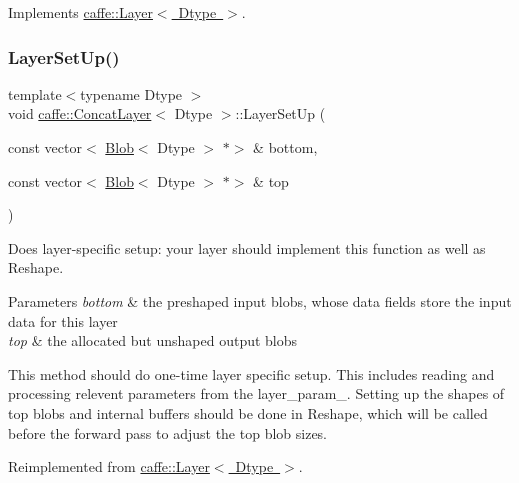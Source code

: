 Implements \mbox{\hyperlink{classcaffe_1_1_layer_a576ac6a60b1e99fe383831f52a6cea77}{caffe\+::\+Layer$<$ Dtype $>$}}.

\mbox{\label{classcaffe_1_1_concat_layer_af4fc13f4977f84a30af260096ffd55d2}} 
\subsubsection{\texorpdfstring{Layer\+Set\+Up()}{LayerSetUp()}\hspace{0.1cm}{\footnotesize\ttfamily [1/2]}}
{\footnotesize\ttfamily template$<$typename Dtype $>$ \\
void \mbox{\hyperlink{classcaffe_1_1_concat_layer}{caffe\+::\+Concat\+Layer}}$<$ Dtype $>$\+::Layer\+Set\+Up (\begin{DoxyParamCaption}\item[{const vector$<$ \mbox{\hyperlink{classcaffe_1_1_blob}{Blob}}$<$ Dtype $>$ $\ast$$>$ \&}]{bottom,  }\item[{const vector$<$ \mbox{\hyperlink{classcaffe_1_1_blob}{Blob}}$<$ Dtype $>$ $\ast$$>$ \&}]{top }\end{DoxyParamCaption})\hspace{0.3cm}{\ttfamily [virtual]}}



Does layer-\/specific setup\+: your layer should implement this function as well as Reshape. 


\begin{DoxyParams}{Parameters}
{\em bottom} & the preshaped input blobs, whose data fields store the input data for this layer \\
\hline
{\em top} & the allocated but unshaped output blobs\\
\hline
\end{DoxyParams}
This method should do one-\/time layer specific setup. This includes reading and processing relevent parameters from the {\ttfamily layer\+\_\+param\+\_\+}. Setting up the shapes of top blobs and internal buffers should be done in {\ttfamily Reshape}, which will be called before the forward pass to adjust the top blob sizes. 

Reimplemented from \mbox{\hyperlink{classcaffe_1_1_layer_a481323a3e0972c682787f2137468c29f}{caffe\+::\+Layer$<$ Dtype $>$}}.

